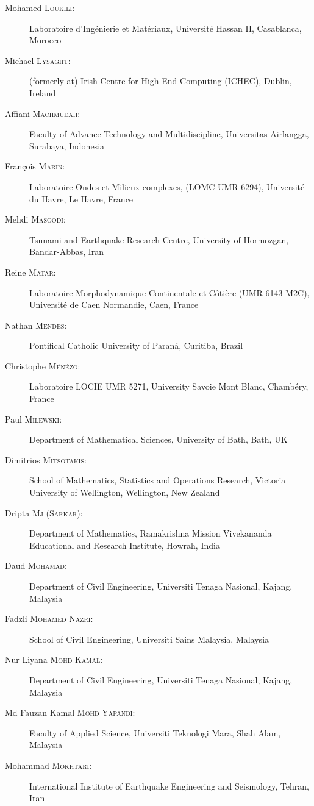 \documentclass[final, a4paper, oneside, 12pt]{article}
\numberwithin{equation}{section}
\begin{document}
\begin{description}
  \item[Mohamed \textsc{Loukili}:] Laboratoire d'Ing\'enierie et Mat\'eriaux, Universit\'e Hassan II, Casablanca, Morocco
  \item[Michael \textsc{Lysaght}:] (formerly at) Irish Centre for High-End Computing (ICHEC), Dublin, Ireland
  \item[Affiani \textsc{Machmudah}:] Faculty of Advance Technology and Multidiscipline, Universitas Airlangga, Surabaya, Indonesia
  \item[Fran\c{c}ois \textsc{Marin}:] Laboratoire Ondes et Milieux complexes, (LOMC UMR 6294), Universit\'e du Havre, Le Havre, France
  \item[Mehdi \textsc{Masoodi}:] Tsunami and Earthquake Research Centre, University of Hormozgan, Bandar-Abbas, Iran
  \item[Reine \textsc{Matar}:] Laboratoire Morphodynamique Continentale et C\^oti\`ere (UMR 6143 M2C), Universit\'e de Caen Normandie, Caen, France
  \item[Nathan \textsc{Mendes}:] Pontifical Catholic University of Paran\'a, Curitiba, Brazil
  \item[Christophe \textsc{M\'en\'ezo}:] Laboratoire LOCIE UMR 5271, University Savoie Mont Blanc, Chamb\'ery, France
  \item[Paul \textsc{Milewski}:] Department of Mathematical Sciences, University of Bath, Bath, UK
  \item[Dimitrios \textsc{Mitsotakis}:] School of Mathematics, Statistics and Operations Research, Victoria University of Wellington, Wellington, New Zealand
  \item[Dripta \textsc{Mj} (\textsc{Sarkar}):] Department of Mathematics, Ramakrishna Mission Vivekananda Educational and Research Institute, Howrah, India
  \item[Daud \textsc{Mohamad}:] Department of Civil Engineering, Universiti Tenaga Nasional, Kajang, Malaysia
  \item[Fadzli \textsc{Mohamed Nazri}:] School of Civil Engineering, Universiti Sains Malaysia, Malaysia
  \item[Nur Liyana \textsc{Mohd Kamal}:] Department of Civil Engineering, Universiti Tenaga Nasional, Kajang, Malaysia
  \item[Md Fauzan Kamal \textsc{Mohd Yapandi}:] Faculty of Applied Science, Universiti Teknologi Mara, Shah Alam, Malaysia
  \item[Mohammad \textsc{Mokhtari}:] International Institute of Earthquake Engineering and Seismology, Tehran, Iran

\end{description}
\end{document}
